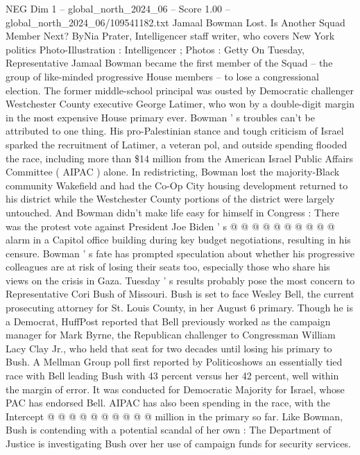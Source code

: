 \begin{textsample}{NEG Dim 1 – global\_north\_2024\_06 – Score 1.00 – global\_north\_2024\_06/109541182.txt}  \label{ex:f1_neg_217}
Jamaal Bowman Lost.
Is Another Squad Member Next?
ByNia Prater, Intelligencer staff writer, who covers New York politics Photo-Illustration : Intelligencer ; Photos : Getty On Tuesday, Representative Jamaal Bowman became the first member of the Squad -- the group of like-minded progressive House members -- to lose a congressional election.
The former middle-school principal was ousted by Democratic challenger Westchester County executive George Latimer, who won by a double-digit margin in the most expensive House primary ever.
Bowman ' s troubles can't be attributed to one thing.
His pro-Palestinian stance and tough criticism of Israel sparked the recruitment of Latimer, a veteran pol, and outside spending flooded the race, including more than \$14 million from the American Israel Public Affairs Committee ( AIPAC ) alone.
In redistricting, Bowman lost the majority-Black community Wakefield and had the Co-Op City housing development returned to his district while the Westchester County portions of the district were largely untouched.
And Bowman didn't make life easy for himself in Congress : There was the protest vote against President Joe Biden ' s @ @ @ @ @ @ @ @ @ @ alarm in a Capitol office building during key budget negotiations, resulting in his censure.
Bowman ' s fate has prompted speculation about whether his progressive colleagues are at risk of losing their seats too, especially those who share his views on the crisis in Gaza.
Tuesday ' s results probably pose the most concern to Representative Cori Bush of Missouri.
Bush is set to face Wesley Bell, the current prosecuting attorney for St.
Louis County, in her August 6 primary.
Though he is a Democrat, HuffPost reported that Bell previously worked as the campaign manager for Mark Byrne, the Republican challenger to Congressman William Lacy Clay Jr., who held that seat for two decades until losing his primary to Bush.
A Mellman Group poll first reported by Politicoshows an essentially tied race with Bell leading Bush with 43 percent versus her 42 percent, well within the margin of error.
It was conducted for Democratic Majority for Israel, whose PAC has endorsed Bell.
AIPAC has also been spending in the race, with the Intercept @ @ @ @ @ @ @ @ @ @ million in the primary so far.
Like Bowman, Bush is contending with a potential scandal of her own : The Department of Justice is investigating Bush over her use of campaign funds for security services.

\end{textsample}
